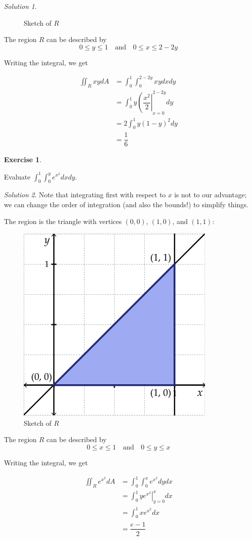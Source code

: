 \documentclass[
]{book}
\theoremstyle{definition}
\theoremstyle{definition}
\theoremstyle{definition}
\newtheorem{exercise}{Exercise}[chapter]
\theoremstyle{definition}
\theoremstyle{remark}
\newtheorem*{solution}{Solution}
\begin{document}
\begin{solution}
\begin{figure}
{}

\caption{Sketch of $R$}\label{fig:unnamed-chunk-21}
\end{figure}

The region \(R\) can be described by \[0\leq y\leq 1 \quad \mbox{and}\quad 0\leq x \leq 2-2y\]

Writing the integral, we get

\begin{align*}
\displaystyle \iint_R xy dA & = \int_0^1\int_0^{2-2y}xy dx dy \\
&= \int_0^1 y \left (\dfrac{x^2}{2}\right |_{x=0}^{2-2y} dy\\
&= 2\int_0^1 y(1-y)^2 dy\\
&=\dfrac{1}{6}
\end{align*}

\end{solution}

\begin{exercise}
\protect\hypertarget{exr:unlabeled-div-85}{}\label{exr:unlabeled-div-85}

Evaluate \(\displaystyle \int_0^1\int_0^y e^{x^2}dxdy\).

\end{exercise}

\begin{solution}

Note that integrating first with respect to \(x\) is not to our advantage; we can change the order of integration (and also the bounds!) to simplify things.

The region is the triangle with vertices \((0,0)\), \((1,0)\), and \((1,1)\):

\begin{figure}

{\centering \includegraphics[width=0.3\linewidth]{images/lec-11-3} 

}

\caption{Sketch of $R$}\label{fig:unnamed-chunk-22}
\end{figure}

The region \(R\) can be described by \[0\leq x\leq 1 \quad \mbox{and}\quad 0\leq y \leq x\]

Writing the integral, we get

\begin{align*}
\displaystyle \iint_R e^{x^2} dA & = \int_0^1\int_0^{x}e^{x^2} dy dx \\
&= \int_0^1 y \left . e^{x^2}\right |_{y=0}^{x} dx\\
&= \int_0^1 xe^{x^2} dx\\
&=\dfrac{e-1}{2}
\end{align*}

\end{solution}
\end{document}
